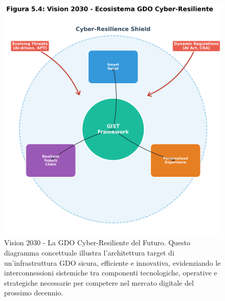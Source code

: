 \begin{figure}[htbp]
\centering
\includegraphics[width=1\textwidth]{thesis_figures/cap5/figura_5_4_vision_2030_matplotlib.png}
\caption{Vision 2030 - La GDO Cyber-Resiliente del Futuro. Questo diagramma concettuale illustra l'architettura target di un'infrastruttura GDO sicura, efficiente e innovativa, evidenziando le interconnessioni sistemiche tra componenti tecnologiche, operative e strategiche necessarie per competere nel mercato digitale del prossimo decennio.}
\label{fig:vision_2030}
\end{figure}


